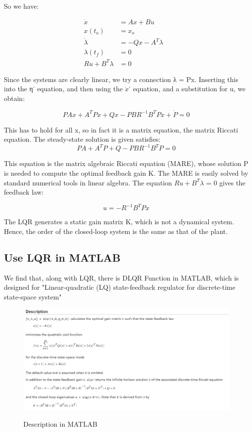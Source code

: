 \documentclass{mcmthesis}
\begin{document}
So we have:

$$\begin{aligned}
\dot{x} &=A x+B u \\
x\left(t_{o}\right) &=x_{o} \\
\dot{\lambda}&=-Q x-A^{T} \lambda & \\
\lambda\left(t_{f}\right) &=0 \\
R u+B^{T} \lambda &=0
\end{aligned}$$

Since the systems are clearly linear, we try a connection λ = Px. Inserting this into the η˙
equation, and then using the $\dot{x}$˙ equation, and a substitution for u, we obtain:

$$P A x+A^{T} P x+Q x-P B R^{-1} B^{T} P x+\dot{P}=0$$

This has to hold for all x, so in fact it is a matrix equation, the matrix Riccati equation.
The steady-state solution is given satisfies:
$$P A+A^{T} P+Q-P B R^{-1} B^{T} P=0$$

This equation is the matrix algebraic Riccati equation (MARE), whose solution P is needed
to compute the optimal feedback gain K. The MARE is easily solved by standard numerical
tools in linear algebra.
The equation $Ru + B^T \lambda$ = 0 gives the feedback law:

$$u = −R^{−1}B^{T}Px$$

The LQR generates a static gain matrix K, which is not a dynamical system.
Hence, the order of the closed-loop system is the same as that of the plant.

\subsection{Use LQR in MATLAB}

We find that, along with LQR, there is DLQR Function in MATLAB, which is designed for "Linear-quadratic (LQ) state-feedback regulator for discrete-time state-space system" 
\begin{figure}[H]%
  \centering
  \caption{Description in MATLAB}
  \includegraphics[width=\columnwidth]{Optimal Control of a Linear Discrete System/MCM20200128/picture/DLQR.png} %
  \label{Fig.RNN} %
\end{figure}
\end{document}
